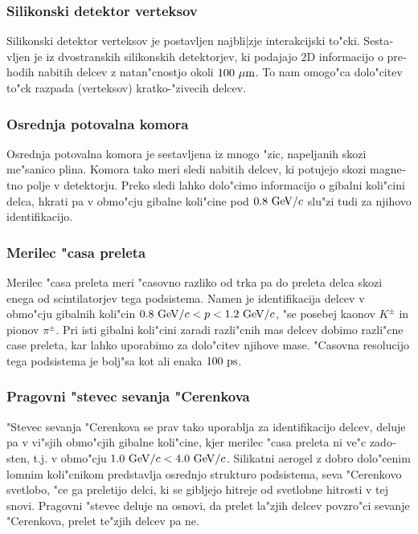 \begin{otherlanguage}{slovene}
\subsubsection{Silikonski  detektor verteksov}
Silikonski detektor verteksov je postavljen najbli|zje interakcijski to"cki. Sestavljen je iz dvostranskih silikonskih detektorjev, ki podajajo 2D informacijo o prehodih nabitih delcev z natan"cnostjo okoli $100\mathrm{~\mu m}$. To nam omogo"ca dolo"citev to"ck razpada (verteksov) kratko-"zivecih delcev.

\subsubsection{Osrednja potovalna komora}
Osrednja potovalna komora je sestavljena iz mnogo "zic, napeljanih skozi me"sanico plina.  Komora tako meri sledi nabitih delcev, ki potujejo skozi magnetno polje v detektorju. Preko sledi lahko dolo"cimo informacijo o gibalni koli"cini delca, hkrati pa v obmo"cju gibalne koli"cine pod $0.8\mathrm{~GeV}/c$ slu"zi tudi za njihovo identifikacijo.

\subsubsection{Merilec "casa preleta}
Merilec "casa preleta meri "casovno razliko od trka pa do preleta delca skozi enega od scintilatorjev tega podsistema. Namen je identifikacija delcev v obmo"cju gibalnih koli"cin $0.8\mathrm{~GeV}/c < p < 1.2\mathrm{~GeV}/c$, "se posebej kaonov $K^\pm$ in pionov $\pi^\pm$. Pri isti gibalni koli"cini zaradi razli"cnih mas delcev dobimo razli"cne case preleta, kar lahko uporabimo za dolo"citev njihove mase. "Casovna resolucijo tega podsistema je bolj"sa kot ali enaka $100\mathrm{~ps}$.

\subsubsection{Pragovni "stevec sevanja "Cerenkova}
"Stevec sevanja "Cerenkova se prav tako uporablja za identifikacijo delcev, deluje pa v vi"sjih obmo"cjih gibalne koli"cine, kjer merilec "casa preleta ni ve"c zadosten, t.j. v obmo"cju $1.0\mathrm{~GeV}/c < 4.0\mathrm{~GeV}/c$. Silikatni aerogel z dobro dolo"cenim lomnim koli"cnikom predstavlja osrednjo strukturo podsistema, seva "Cerenkovo svetlobo, "ce ga preletijo delci, ki se gibljejo hitreje od svetlobne hitrosti v tej snovi. Pragovni "stevec deluje na osnovi, da prelet la"zjih delcev povzro"ci sevanje "Cerenkova, prelet te"zjih delcev pa ne.


\end{otherlanguage}
